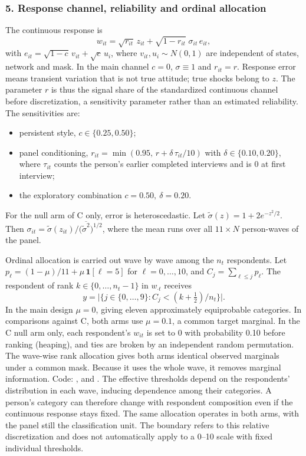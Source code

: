 \subsubsection*{5. Response channel, reliability and ordinal allocation}
The continuous response is
\begin{equation*}
w_{it}=\sqrt{r_{it}}\,z_{it}+\sqrt{1-r_{it}}\;\sigma_{it}\,e_{it},
\end{equation*}
with $e_{it}=\sqrt{1-c}\,v_{it}+\sqrt c\,u_i$, where $v_{it},u_i\sim N(0,1)$ are independent of states, network and mask. In the main channel $c=0$, $\sigma\equiv1$ and $r_{it}=r$. Response error means transient variation that is not true attitude; true shocks belong to $z$. The parameter $r$ is thus the signal share of the standardized continuous channel before discretization, a sensitivity parameter rather than an estimated reliability. The sensitivities are:
\begin{itemize}
\item persistent style, $c\in\{0.25,0.50\}$;
\item panel conditioning, $r_{it}=\min(0.95,\,r+\delta\,\tau_{it}/10)$ with $\delta\in\{0.10,0.20\}$, where $\tau_{it}$ counts the person's earlier completed interviews and is 0 at first interview;
\item the exploratory combination $c=0.50,\ \delta=0.20$.
\end{itemize}
For the null arm of C only, error is heteroscedastic. Let $\tilde\sigma(z)=1+2e^{-z^2/2}$. Then $\sigma_{it}=\tilde\sigma(z_{it})\big/\bigl(\overline{\tilde\sigma^2}\bigr)^{1/2}$, where the mean runs over all $11\times N$ person-waves of the panel.

Ordinal allocation is carried out wave by wave among the $n_t$ respondents. Let $p_\ell=(1-\mu)/11+\mu\,\mathbf 1[\ell=5]$ for $\ell=0,\ldots,10$, and $C_j=\sum_{\ell\le j}p_\ell$. The respondent of rank $k\in\{0,\ldots,n_t-1\}$ in $w_{\cdot t}$ receives
\begin{equation*}
y=\bigl|\{j\in\{0,\ldots,9\}:C_j<(k+\tfrac12)/n_t\}\bigr|.
\end{equation*}
In the main design $\mu=0$, giving eleven approximately equiprobable categories. In comparisons against C, both arms use $\mu=0.1$, a common target marginal. In the C null arm only, each respondent's $w_{it}$ is set to 0 with probability 0.10 before ranking (heaping), and ties are broken by an independent random permutation. The wave-wise rank allocation gives both arms identical observed marginals under a common mask. Because it uses the whole wave, it removes marginal information. Code: ,  and .
The effective thresholds depend on the respondents' distribution in each wave, inducing dependence among their categories. A person's category can therefore change with respondent composition even if the continuous response stays fixed. The same allocation operates in both arms, with the panel still the classification unit. The boundary refers to this relative discretization and does not automatically apply to a 0--10 scale with fixed individual thresholds. %

